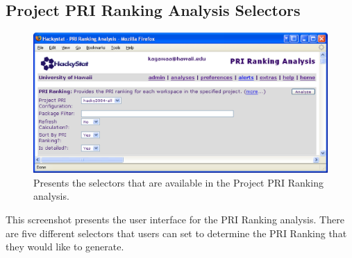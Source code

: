 \subsection{Project PRI Ranking Analysis Selectors}
\begin{figure}[ht]
  \centering
  \includegraphics[width=1.00\textwidth]{figs/UserInterface/analysis-priRanking-command.eps}
  \caption[Project PRI Ranking analysis selectors]{Presents the
    selectors that are available in the Project PRI Ranking analysis.}
  \label{fig:analysis-priRanking-command}
\end{figure}
This screenshot presents the user interface for the PRI Ranking analysis.
There are five different selectors that users can set to determine the PRI
Ranking that they would like to generate.

